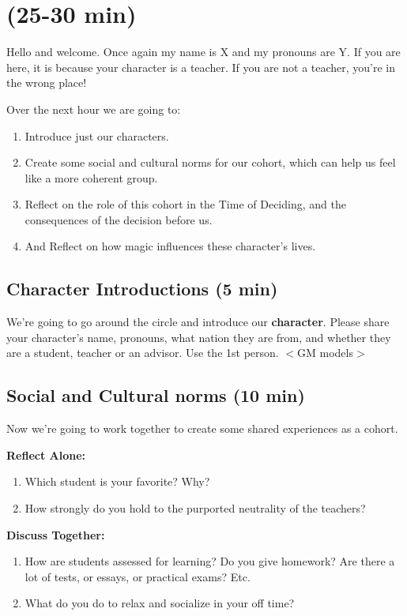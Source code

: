 \documentclass[green]{GL2020}
\begin{document}
\name{\gPreGameTeacher{}}

\section*{(25-30 min)}

Hello and welcome. Once again my name is X and my pronouns are Y. If you are here, it is because your character is a teacher. If you are not a teacher, you're in the wrong place!

Over the next hour we are going to:
\begin{enumerate}
	\item Introduce just our characters.
	\item Create some social and cultural norms for our cohort, which can help us feel like a more coherent group.
	\item Reflect on the role of this cohort in the Time of Deciding, and the consequences of the decision before us.
	\item And Reflect on how magic influences these character’s lives.
\end{enumerate}

\subsection*{Character Introductions (5 min)}
We’re going to go around the circle and introduce our \textbf{character}. Please share your character’s name, pronouns, what nation they are from, and whether they are a student, teacher or an advisor. Use the 1st person. $<$GM models$>$

\subsection*{Social and Cultural norms (10 min)}
Now we’re going to work together to create some shared experiences as a cohort.

\textbf{Reflect Alone:}
\begin{enumerate}
	\item Which student is your favorite? Why?
	\item How strongly do you hold to the purported neutrality of the teachers?
\end{enumerate}

\textbf{Discuss Together:}
\begin{enumerate}
	\item How are students assessed for learning? Do you give homework? Are there a lot of tests, or essays, or practical exams? Etc.
	\item What do you do to relax and socialize in your off time?
\end{enumerate}
\end{document}

